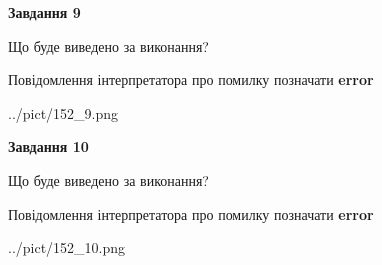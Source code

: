 \documentclass[12pt, ukrainian]{article}
\begin{document}
{{\begin {center}\textbf{Завдання 9}\end {center}}\par
Що буде виведено за виконання? \par
Повідомлення інтерпретатора про помилку позначати \textbf{error}

\begin{center}
	{../pict/152_9.png}
\end{center}
\newpage

{\begin {center}\textbf{Завдання 10}\end {center}}\par
Що буде виведено за виконання? \par
Повідомлення інтерпретатора про помилку позначати \textbf{error}

\begin{center}
	{../pict/152_10.png}
\end{center}
\newpage

}
\end{document}
